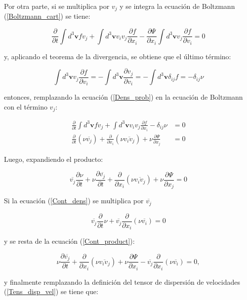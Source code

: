 Por otra parte, si se multiplica por $v_j$ y se integra la ecuación de Boltzmann (\ref{Boltzmann_cart}) se tiene:

$$ \frac{\partial }{\partial t} \int d^3\textbf{v} f v_j + \int d^3 \textbf{v} v_i v_j \frac{\partial f}{\partial x_i} - \frac{\partial \Psi}{\partial x_i} \int d^3\textbf{v} v_j \frac{\partial f}{\partial v_i} = 0 $$

y, aplicando el teorema de la divergencia, se obtiene que el último término:

$$ \int d^3\textbf{v} v_j \frac{\partial f}{\partial v_i} = - \int d^3\textbf{v} \frac{\partial v_j}{\partial v_i} = -\int d^3\textbf{v} \delta_{ij} f = -\delta_{ij} \nu $$

entonces, remplazando la ecuación (\ref{Dens_prob}) en la ecuación de Boltzmann con el término $v_j$:

\begin{align}
\frac{\partial }{\partial t} \int d^3\textbf{v} f v_j + \int d^3 \textbf{v} v_i v_j \frac{\partial f}{\partial x_i} - \delta_{ij} \nu  &= 0\\
\frac{\partial }{\partial t} (\nu \overline{v_j} ) + \frac{\partial }{\partial x_i} (\nu \overline{v_i v_j} ) + \nu \frac{\partial \Psi}{\partial x_j} &= 0
\end{align}

Luego, expandiendo el producto:

\begin{equation}
\label{Cont_product}
\overline{v_j} \frac{\partial \nu}{\partial t} + \nu \frac{\partial \overline{v_j}}{\partial t} +  \frac{\partial }{\partial x_i} (\nu \overline{v_i v_j} )  + \nu \frac{\partial \Psi}{\partial x_j} = 0
\end{equation}

Si la ecuación (\ref{Cont_dens}) se multiplica por $\overline{v_j}$

$$ \overline{v_j} \frac{\partial }{\partial t} \nu + \overline{v_j} \frac{\partial }{\partial x_i} (\nu \overline{v_i}) = 0  $$

y se resta de la ecuación (\ref{Cont_product}):

\begin{equation}
\nu \frac{\partial \overline{v_j}}{\partial t} + \frac{\partial }{\partial x_i} (\nu \overline{v_i v_j} ) + \nu \frac{\partial \Psi }{\partial x_i} - \overline{v_j} \frac{\partial }{\partial x_i} (\nu \overline{v_i}) = 0,
\end{equation}

y finalmente remplazando la definición del tensor de dispersión de velocidades (\ref{Tens_disp_vel}) se tiene que:

